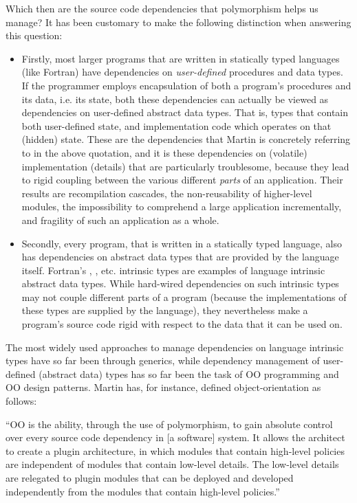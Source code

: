 \documentclass[11pt,oneside]{report}
\newcommand{\code}[1]{{\selectfont\ttfamily{#1}}}
\begin{document}
Which then are the source code dependencies that polymorphism helps us
manage? It has been customary to make the following distinction when
answering this question:
\begin{itemize}
\item
  Firstly, most larger programs that are written in statically typed
  languages (like Fortran) have dependencies on \emph{user-defined}
  procedures and data types. If the programmer employs encapsulation
  of both a program's procedures and its data, i.e. its state, both
  these dependencies can actually be viewed as dependencies on
  user-defined abstract data types. That is, types that contain both
  user-defined state, and implementation code which operates on that
  (hidden) state. These are the dependencies that Martin is concretely
  referring to in the above quotation, and it is these dependencies on
  (volatile) implementation (details) that are particularly
  troublesome, because they lead to rigid coupling between the various
  different \emph{parts} of an application. Their results are
  recompilation cascades, the non-reusability of higher-level modules,
  the impossibility to comprehend a large application incrementally,
  and fragility of such an application as a whole.
\item
  Secondly, every program, that is written in a statically typed
  language, also has dependencies on abstract data types that are
  provided by the language itself. Fortran's \code{integer},
  \code{real}, etc. intrinsic types are examples of language intrinsic
  abstract data types. While hard-wired dependencies on such intrinsic
  types may not couple different parts of a program (because the
  implementations of these types are supplied by the language), they
  nevertheless make a program's source code rigid with respect to the
  data that it can be used on.
\end{itemize}

The most widely used approaches to manage dependencies on language
intrinsic types have so far been through generics, while dependency
management of user-defined (abstract data) types has so far been the
task of OO programming and OO design patterns. Martin \cite{Martin_17}
has, for instance, defined object-orientation as follows:

\begin{displayquote}
  ``OO is the ability, through the use of polymorphism, to gain
  absolute control over every source code dependency in [a software]
  system. It allows the architect to create a plugin architecture, in
  which modules that contain high-level policies are independent of
  modules that contain low-level details. The low-level details are
  relegated to plugin modules that can be deployed and developed
  independently from the modules that contain high-level policies.''
\end{displayquote}
\end{document}
